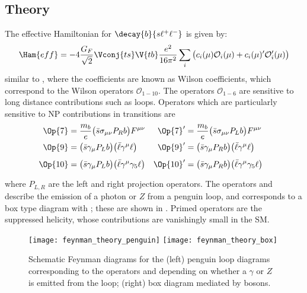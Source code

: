 \subsection{Theory}
The effective Hamiltonian for $\decay{b}{s\ell^+\ell^-}$ is given by:
\begin{equation}
  \Ham{eff} = -4\frac{G_F}{\sqrt{2}}\Vconj{ts}\V{tb}\frac{e^2}{16\pi^2}
  \sum_{i}\big(c_i(\mu)\mathcal{O}_i(\mu) + c_i(\mu)^\prime\mathcal{O}_i^\prime(\mu)\big)
\end{equation}
similar to , where the coefficients are known as Wilson coefficients, which
correspond to the Wilson operators $\mathcal{O}_{1-10}$.
The operators $\mathcal{O}_{1-6}$ are sensitive to long distance contributions such as \ccbar
loops.
Operators which are particularly sensitive to NP contributions in  transitions are
\begin{align}
  \Op{7} &= \frac{m_b}{e}\big(\bar s \sigma_{\mu\nu}P_Rb\big)F^{\mu\nu}
  &\Op{7}^\prime &= \frac{m_b}{e}\big(\bar s \sigma_{\mu\nu}P_Lb\big)F^{\mu\nu}
  \nonumber\\
  \Op{9} &= \big(\bar s\gamma_\mu P_Lb\big)\big(\bar\ell\gamma^\mu\ell\big)
  &\Op{9}^\prime &= \big(\bar s\gamma_\mu P_Rb\big)\big(\bar\ell\gamma^\mu\ell\big)
  \nonumber\\
  \Op{10} &= \big(\bar s\gamma_\mu P_Lb\big)\big(\bar\ell\gamma^\mu\gamma_5\ell\big)
  &\Op{10}^\prime &= \big(\bar s\gamma_\mu P_Rb\big)\big(\bar\ell\gamma^\mu\gamma_5\ell\big)
  \phantom{\frac{1}{1}}
\end{align}
where $P_{L,R}$ are the left and right projection operators.
The operators  and  describe the emission of a photon or $Z$ from a penguin loop,
and  corresponds to a box type diagram with \Wp; these are shown in .
Primed operators are the suppressed helicity, whose contributions are vanishingly small in the SM.

\begin{figure}
  \begin{center}
    \texttt{[image: feynman\_theory\_penguin]}
    \texttt{[image: feynman\_theory\_box]}
    \caption{\small
      Schematic Feynman diagrams for the
      (left) penguin loop diagrams corresponding to the operators  and  depending on
      whether a $\gamma$ or $Z$ is emitted from the loop;
      (right)  box diagram mediated by \Wp bosons.
    }
    \label{fig:hhh:loops}
  \end{center}
\end{figure}


